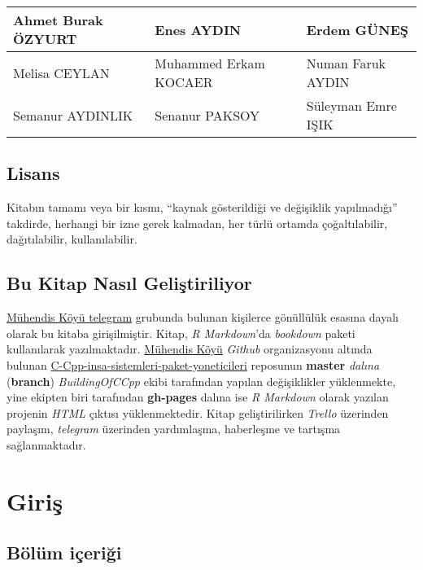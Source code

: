 \documentclass[
]{book}
\begin{document}
\begin{tabular}{l|l|l}
\hline
Ahmet Burak ÖZYURT & Enes AYDIN & Erdem GÜNEŞ\\
\hline
Melisa CEYLAN & Muhammed Erkam KOCAER & Numan Faruk AYDIN\\
\hline
Semanur AYDINLIK & Senanur PAKSOY & Süleyman Emre IŞIK\\
\hline
\end{tabular}

\hypertarget{lisans}{%
\section*{Lisans}\label{lisans}}

Kitabın tamamı veya bir kısmı, ``kaynak gösterildiği ve değişiklik yapılmadığı'' takdirde, herhangi bir izne gerek kalmadan, her türlü ortamda çoğaltılabilir, dağıtılabilir, kullanılabilir.

\hypertarget{bu-kitap-nasux131l-geliux15ftiriliyor}{%
\section*{Bu Kitap Nasıl Geliştiriliyor}\label{bu-kitap-nasux131l-geliux15ftiriliyor}}

\href{https://t.me/koyumuhendis}{Mühendis Köyü telegram} grubunda bulunan kişilerce gönüllülük esasına dayalı olarak bu kitaba girişilmiştir. Kitap, \emph{R Markdown}'da \emph{bookdown} paketi kullanılarak yazılmaktadır. \href{https://github.com/MuhendisKoyu}{Mühendis Köyü} \emph{Github} organizasyonu altında bulunan \href{https://github.com/MuhendisKoyu/C-Cpp-insa-sistemleri-paket-yoneticileri}{C-Cpp-insa-sistemleri-paket-yoneticileri} reposunun \textbf{master} \emph{dalına} (\textbf{branch}) \emph{BuildingOfCCpp} ekibi tarafından yapılan değişiklikler yüklenmekte, yine ekipten biri tarafından \textbf{gh-pages} dalına ise \emph{R Markdown} olarak yazılan projenin \emph{HTML} çıktısı yüklenmektedir. Kitap geliştirilirken \emph{Trello} üzerinden paylaşım, \emph{telegram} üzerinden yardımlaşma, haberleşme ve tartışma sağlanmaktadır.

\hypertarget{giris}{%
\chapter{Giriş}\label{giris}}

\hypertarget{buxf6luxfcm-iuxe7eriux11fi}{%
\section{Bölüm içeriği}\label{buxf6luxfcm-iuxe7eriux11fi}}
\end{document}
